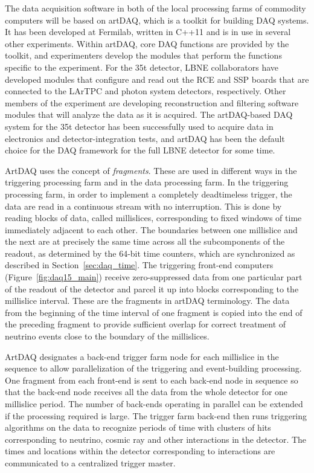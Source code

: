 The data acquisition software in both of the local processing farms of
commodity computers will be based on artDAQ, which is a toolkit for
building DAQ systems.  It has been developed at Fermilab, written in
C++11 and is in use in several other experiments.  Within artDAQ, core
DAQ functions are provided by the toolkit, and experimenters develop
the modules that perform the functions specific to the
experiment.  For the 35t detector, LBNE collaborators have
developed modules that configure and read out the RCE and SSP boards
that are connected to the LArTPC and photon system detectors,
respectively.  Other members of the experiment are %
developing
reconstruction and filtering software modules that will analyze the
data as it is acquired.  The artDAQ-based DAQ system for the 35t
detector has been successfully used to acquire data in electronics and
detector-integration tests, and artDAQ has been the default choice for
the DAQ framework for the full LBNE detector for some time.

ArtDAQ uses the concept of {\it fragments}. These are used
in different ways in the triggering processing farm and in the data
processing farm.  In the triggering processing farm, in order to
implement a completely deadtimeless trigger, the data are read in a
continuous stream with no interruption.  This is done by reading
blocks of data, called millislices, corresponding to fixed windows of
time %
immediately adjacent to each other.  The boundaries
between one millislice and the next are at precisely the same time
across all the subcomponents of the readout, as determined by the
64-bit time counters, which are synchronized as described in
Section~\ref{sec:daq_time}.  The triggering front-end computers
(Figure~\ref{fig:daq15_main}) receive zero-suppressed data from one
particular part of the readout of the detector and parcel it up into
blocks corresponding to the millislice interval.  These are the
fragments in artDAQ terminology.  The data from the beginning of the
time interval of one fragment is copied into the end of the preceding
fragment to provide sufficient overlap for correct treatment of
neutrino events close to the boundary of the millislices.

ArtDAQ designates a back-end trigger farm node for each millislice in
the sequence to allow parallelization of the triggering and event-building
processing.  One fragment from each front-end is sent to each back-end
node in sequence so that the back-end node receives all the data from
the whole detector for one millislice period.  The number of back-ends
operating in parallel can be extended if the processing required is
large. The trigger farm back-end then runs triggering algorithms on the
data to recognize periods of time with clusters of hits corresponding
to neutrino, cosmic ray and other interactions in the detector.  The
times and locations within the detector corresponding to interactions
are communicated to a centralized trigger master.  

